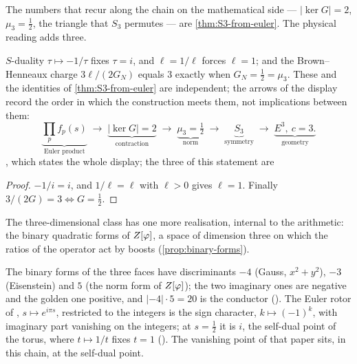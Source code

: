The numbers that recur along the chain on the mathematical side --- $|\ker G|=2$, $\mu_3=\tfrac12$, the triangle
that $S_3$ permutes --- are \cref{thm:S3-from-euler}.  The physical reading adds three.

\begin{proposition}[The numbers of the chain in the physical reading: $\ell=1$, $G_N=\tfrac12$, $c=3$]\label{prop:chain-physics}
$S$-duality $\tau\mapsto-1/\tau$ fixes $\tau=i$, and $\ell=1/\ell$ forces $\ell=1$; and the
Brown--Henneaux charge $3\ell/(2G_N)$ equals $3$ exactly when $G_N=\tfrac12=\mu_3$.
These and the identities of \cref{thm:S3-from-euler} are independent; the arrows of the display record the order in
which the construction meets them, not implications between them:
\[
  \underbrace{\prod_p f_p(s)}_{\text{Euler product}}\;\to\;
  \underbrace{|\ker G|=2}_{\text{contraction}}\;\to\;
  \underbrace{\mu_3=\tfrac12}_{\text{norm}}\;\to\;
  \underbrace{S_3}_{\text{symmetry}}\;\to\;
  \underbrace{E^3,\ c=3.}_{\text{geometry}}
\]
\leavevmode{}, which states the whole display; the three of this
statement are %
\end{proposition}

\begin{proof}
$-1/i=i$, and $1/\ell=\ell$ with $\ell>0$ gives $\ell=1$.  Finally $3/(2G)=3\iff G=\tfrac12$.
\end{proof}

The three-dimensional class has one more realisation, internal to the arithmetic: the binary quadratic forms of
$Z[\varphi]$, a space of dimension three on which the ratios of the operator act by boosts (\cref{prop:binary-forms}).

\begin{remark}\label{rmk:three-forms-rotor}
The binary forms of the three faces have discriminants $-4$ (Gauss, $x^2+y^2$), $-3$
(Eisenstein) and $5$ (the norm form of $Z[\varphi]$); the two imaginary ones are negative and
the golden one positive, and $|{-4}|\cdot5=20$ is the conductor
().  The Euler rotor of
\cite{gonzalez26mersenne}, $s\mapsto e^{i\pi s}$, restricted to the integers is the sign
character, $k\mapsto(-1)^k$, with imaginary part vanishing on the integers; at
$s=\tfrac12$ it is $i$, the self-dual point of the torus, where $t\mapsto1/t$ fixes $t=1$
().  The
vanishing point of that paper sits, in this chain, at the self-dual point.
\end{remark}

